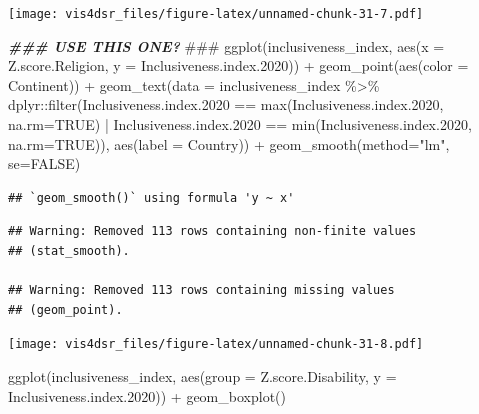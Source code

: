 \documentclass[
]{krantz}
\makeatletter
\newenvironment{Shaded}{\begin{snugshade}}{\end{snugshade}}
\newcommand{\AlertTok}[1]{\textcolor[rgb]{0.33,0.33,0.33}{#1}}
\newcommand{\AttributeTok}[1]{\textcolor[rgb]{0.61,0.61,0.61}{#1}}
\newcommand{\ConstantTok}[1]{\textcolor[rgb]{0,0,0}{#1}}
\newcommand{\DocumentationTok}[1]{\textcolor[rgb]{0.37,0.37,0.37}{\textbf{\textit{#1}}}}
\newcommand{\FloatTok}[1]{\textcolor[rgb]{0.06,0.06,0.06}{#1}}
\newcommand{\FunctionTok}[1]{\textcolor[rgb]{0,0,0}{#1}}
\newcommand{\NormalTok}[1]{#1}
\newcommand{\SpecialCharTok}[1]{\textcolor[rgb]{0,0,0}{#1}}
\newcommand{\StringTok}[1]{\textcolor[rgb]{0.5,0.5,0.5}{#1}}
\newenvironment{kframe}{%
\medskip{}
\setlength{\fboxsep}{.8em}
 \def\at@end@of@kframe{}%
 \ifinner\ifhmode%
  \def\at@end@of@kframe{\end{minipage}}%
  \begin{minipage}{\columnwidth}%
 \fi\fi%
 \def\FrameCommand##1{\hskip\@totalleftmargin \hskip-\fboxsep
 \colorbox{shadecolor}{##1}\hskip-\fboxsep
     \hskip-\linewidth \hskip-\@totalleftmargin \hskip\columnwidth}%
 \MakeFramed {\advance\hsize-\width
   \@totalleftmargin\z@ \linewidth\hsize
   \@setminipage}}%
 {\par\unskip\endMakeFramed%
 \at@end@of@kframe}
\renewenvironment{Shaded}{\begin{kframe}}{\end{kframe}}
\makeatother
\begin{document}
\texttt{[image: vis4dsr\_files/figure-latex/unnamed-chunk-31-7.pdf]}

\begin{Shaded}
\begin{Highlighting}[]
\DocumentationTok{\#\#\# USE THIS ONE? }\AlertTok{\#\#\#}
\FunctionTok{ggplot}\NormalTok{(inclusiveness\_index, }
       \FunctionTok{aes}\NormalTok{(}\AttributeTok{x =}\NormalTok{ Z.score.Religion, }
           \AttributeTok{y =}\NormalTok{ Inclusiveness.index}\FloatTok{.2020}\NormalTok{)) }\SpecialCharTok{+}
  \FunctionTok{geom\_point}\NormalTok{(}\FunctionTok{aes}\NormalTok{(}\AttributeTok{color =}\NormalTok{ Continent)) }\SpecialCharTok{+}
  \FunctionTok{geom\_text}\NormalTok{(}\AttributeTok{data =}\NormalTok{ inclusiveness\_index }\SpecialCharTok{\%\textgreater{}\%} 
\NormalTok{              dplyr}\SpecialCharTok{::}\FunctionTok{filter}\NormalTok{(Inclusiveness.index}\FloatTok{.2020} \SpecialCharTok{==} \FunctionTok{max}\NormalTok{(Inclusiveness.index}\FloatTok{.2020}\NormalTok{, }\AttributeTok{na.rm=}\ConstantTok{TRUE}\NormalTok{) }\SpecialCharTok{|}\NormalTok{ Inclusiveness.index}\FloatTok{.2020} \SpecialCharTok{==} \FunctionTok{min}\NormalTok{(Inclusiveness.index}\FloatTok{.2020}\NormalTok{, }\AttributeTok{na.rm=}\ConstantTok{TRUE}\NormalTok{)), }\FunctionTok{aes}\NormalTok{(}\AttributeTok{label =}\NormalTok{ Country)) }\SpecialCharTok{+} 
  \FunctionTok{geom\_smooth}\NormalTok{(}\AttributeTok{method=}\StringTok{"lm"}\NormalTok{, }\AttributeTok{se=}\ConstantTok{FALSE}\NormalTok{)}
\end{Highlighting}
\end{Shaded}

\begin{verbatim}
## `geom_smooth()` using formula 'y ~ x'
\end{verbatim}

\begin{verbatim}
## Warning: Removed 113 rows containing non-finite values
## (stat_smooth).

## Warning: Removed 113 rows containing missing values
## (geom_point).
\end{verbatim}

\texttt{[image: vis4dsr\_files/figure-latex/unnamed-chunk-31-8.pdf]}

\begin{Shaded}
\begin{Highlighting}[]
\FunctionTok{ggplot}\NormalTok{(inclusiveness\_index, }
       \FunctionTok{aes}\NormalTok{(}\AttributeTok{group =}\NormalTok{ Z.score.Disability, }
           \AttributeTok{y =}\NormalTok{ Inclusiveness.index}\FloatTok{.2020}\NormalTok{)) }\SpecialCharTok{+}
  \FunctionTok{geom\_boxplot}\NormalTok{()}
\end{Highlighting}
\end{Shaded}
\end{document}
